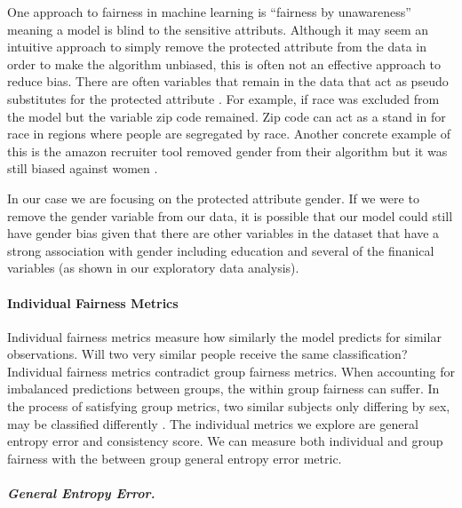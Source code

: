 \documentclass[water,article,submit,moreauthors,pdftex]{mdpi}
\begin{document}
One approach to fairness in machine learning is ``fairness by
unawareness'' meaning a model is blind to the sensitive attributs.
Although it may seem an intuitive approach to simply remove the
protected attribute from the data in order to make the algorithm
unbiased, this is often not an effective approach to reduce bias. There
are often variables that remain in the data that act as pseudo
substitutes for the protected attribute \citep{zhou2022bias}. For
example, if race was excluded from the model but the variable zip code
remained. Zip code can act as a stand in for race in regions where
people are segregated by race. Another concrete example of this is the
amazon recruiter tool removed gender from their algorithm but it was
still biased against women \citep{goodman_2022}.

In our case we are focusing on the protected attribute gender. If we
were to remove the gender variable from our data, it is possible that
our model could still have gender bias given that there are other
variables in the dataset that have a strong association with gender
including education and several of the finanical variables (as shown in
our exploratory data analysis).

\hypertarget{individual-fairness-metrics}{%
\paragraph{Individual Fairness
Metrics}\label{individual-fairness-metrics}}

Individual fairness metrics measure how similarly the model predicts for
similar observations. Will two very similar people receive the same
classification? Individual fairness metrics contradict group fairness
metrics. When accounting for imbalanced predictions between groups, the
within group fairness can suffer\citep{kypraiou_what_2021}. In the
process of satisfying group metrics, two similar subjects only differing
by sex, may be classified differently
\citep{binns2020apparent, mehrabi2021survey, caton2020fairness, zhou2022bias}.
The individual metrics we explore are general entropy error and
consistency score. We can measure both individual and group fairness
with the between group general entropy error metric.

\hypertarget{general-entropy-error.}{%
\subparagraph{General Entropy Error.}\label{general-entropy-error.}}
\end{document}
